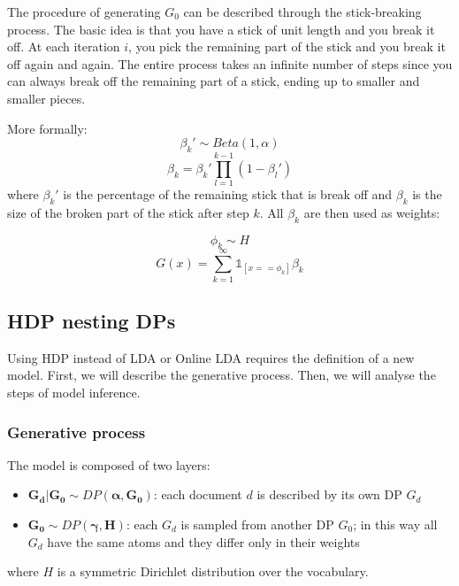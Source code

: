 The procedure of generating $G_0$ can be described through the stick-breaking process.
The basic idea is that you have a stick of unit length and you break it off.
At each iteration $i$, you pick the remaining part of the stick and you break it off again and again.
The entire process takes an infinite number of steps since you can always break off the remaining part
of a stick, ending up to smaller and smaller pieces.

More formally:
\begin{equation*}
    \beta_k' \sim \mathit{Beta}(1, \alpha)
\end{equation*}
\begin{equation*}
    \beta_k = \beta_k' \prod_{l=1}^{k-1} (1 - \beta_l')
\end{equation*}
where $\beta_k'$ is the percentage of the remaining stick that is break off
and $\beta_k$ is the size of the broken part of the stick after step $k$.
All $\beta_k$ are then used as weights:

\begin{equation*}
    \phi_k \sim H
\end{equation*}
\begin{equation*}
    G(x) = \sum_{k=1}^{\infty} \mathbb{1}_{[x == \phi_k]} \beta_k
\end{equation*}

\subsection{HDP nesting DPs}
Using HDP instead of LDA or Online LDA requires the definition of a new model.
First, we will describe the generative process.
Then, we will analyse the steps of model inference.

\subsubsection{Generative process}
The model is composed of two layers:
\begin{itemize}
    \item $\boldsymbol{G_d | G_0 \sim \mathit{DP}(\alpha, G_0)}$: each document $d$ is described by its own DP $G_d$
    \item $\boldsymbol{G_0 \sim \mathit{DP}(\gamma, H)}$: each $G_d$ is sampled from another DP $G_0$; in this way all $G_d$ have the same atoms and they differ only in their weights
\end{itemize}
where $H$ is a symmetric Dirichlet distribution over the vocabulary.

